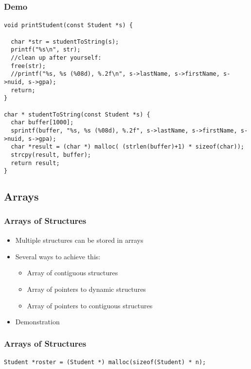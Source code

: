 \documentclass[]{beamer}
\begin{document}
\begin{frame}[fragile]
  \frametitle{Demo}
  \framesubtitle{}

\begin{verbatim}
void printStudent(const Student *s) {

  char *str = studentToString(s);
  printf("%s\n", str);
  //clean up after yourself:
  free(str);
  //printf("%s, %s (%08d), %.2f\n", s->lastName, s->firstName, s->nuid, s->gpa);
  return;
}

char * studentToString(const Student *s) {
  char buffer[1000];
  sprintf(buffer, "%s, %s (%08d), %.2f", s->lastName, s->firstName, s->nuid, s->gpa);
  char *result = (char *) malloc( (strlen(buffer)+1) * sizeof(char));
  strcpy(result, buffer);
  return result;
}
\end{verbatim}

\end{frame}

\subsection{Arrays}

\begin{frame}[fragile]
  \frametitle{Arrays of Structures}
  \framesubtitle{}

\begin{itemize}[<+->]
  \item Multiple structures can be stored in arrays
  \item Several ways to achieve this:
  \begin{itemize}
    \item Array of contiguous structures
    \item Array of pointers to dynamic structures
    \item Array of pointers to contiguous structures
  \end{itemize}
  \item Demonstration
\end{itemize}

\end{frame}

\begin{frame}[fragile]
  \frametitle{Arrays of Structures}
  \framesubtitle{}

\texttt{Student *roster = (Student *) malloc(sizeof(Student) * n);}

\begin{center}
\vskip-1.25cm

\end{center}  
  
\end{frame}
\end{document}
